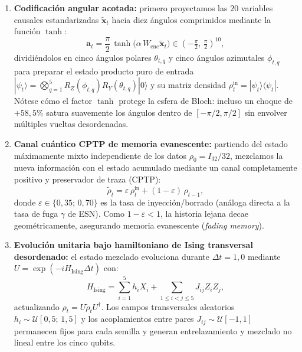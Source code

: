 \documentclass[12pt,letterpaper]{article}
\begin{document}
\begin{enumerate}
  \item \textbf{Codificación angular acotada:} primero proyectamos las \(20\) variables causales estandarizadas \(\tilde{\mathbf{x}}_t\) hacia diez ángulos comprimidos mediante la función \(\tanh\):
  \begin{equation}
    \mathbf{a}_t = \frac{\pi}{2}\,\tanh\bigl(\alpha\, W_{\text{enc}}\tilde{\mathbf{x}}_t\bigr) \in \left(-\tfrac{\pi}{2},\, \tfrac{\pi}{2}\right)^{10},
    \label{eq:qrc_angles}
  \end{equation}
  dividiéndolos en cinco ángulos polares \(\theta_{t,q}\) y cinco ángulos azimutales \(\phi_{t,q}\) para preparar el estado producto puro de entrada \(|\psi_t\rangle = \bigotimes_{q=1}^{5} R_Z(\phi_{t,q}) R_Y(\theta_{t,q})|0\rangle\) y su matriz densidad \(\rho_t^{\text{in}} = |\psi_t\rangle\langle\psi_t|\). Nótese cómo el factor \(\tanh\) protege la esfera de Bloch: incluso un choque de \(+58{,}5\%\) satura suavemente los ángulos dentro de \([-\pi/2, \pi/2]\) sin envolver múltiples vueltas desordenadas.
  \item \textbf{Canal cuántico CPTP de memoria evanescente:} partiendo del estado máximamente mixto independiente de los datos \(\rho_0 = I_{32}/32\), mezclamos la nueva información con el estado acumulado mediante un canal completamente positivo y preservador de traza (CPTP):
  \begin{equation}
    \tilde{\rho}_t = \varepsilon\,\rho_t^{\text{in}} + (1 - \varepsilon)\,\rho_{t-1},
    \label{eq:qrc_cptp}
  \end{equation}
  donde \(\varepsilon \in \{0{,}35;\, 0{,}70\}\) es la tasa de inyección/borrado (análoga directa a la tasa de fuga \(\gamma\) de ESN). Como \(1 - \varepsilon < 1\), la historia lejana decae geométricamente, asegurando memoria evanescente (\emph{fading memory}).
  \item \textbf{Evolución unitaria bajo hamiltoniano de Ising transversal desordenado:} el estado mezclado evoluciona durante \(\Delta t = 1{,}0\) mediante \(U = \exp(-i H_{\text{Ising}}\Delta t)\) con:
  \begin{equation}
    H_{\text{Ising}} = \sum_{i=1}^{5} h_i X_i + \sum_{1 \le i < j \le 5} J_{ij} Z_i Z_j,
    \label{eq:ising}
  \end{equation}
  actualizando \(\rho_t = U \tilde{\rho}_t U^\dagger\). Los campos transversales aleatorios \(h_i \sim \mathcal{U}[0{,}5;\, 1{,}5]\) y los acoplamientos entre pares \(J_{ij} \sim \mathcal{U}[-1, 1]\) permanecen fijos para cada semilla y generan entrelazamiento y mezclado no lineal entre los cinco qubits.

\end{enumerate}
\end{document}
